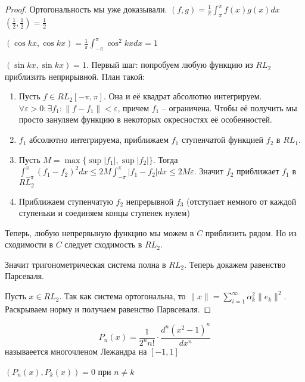 \documentclass[document.tex]{subfiles}
\begin{document}
\begin{proof}
    Ортогональность мы уже доказывали. $(f, g) = \frac{1}{\pi}\int_{\pi}^{\pi}f(x)g(x)dx$
    $(\frac{1}{2}, \frac{1}{2}) = \frac{1}{2}$

    $(\cos kx, \cos kx) = \frac{1}{\pi}\int_{-\pi}^{\pi}\cos^2 kx dx = 1$

    $(\sin kx, \sin kx) = 1$.
    Первый шаг: попробуем любую функцию из $RL_2$ приблизить неприрывной. План такой: 
    \begin{enumerate}
        \item Пусть $f \in RL_2[-\pi, \pi]$. Она и её квадрат абсолютно интегрируем. $\forall \varepsilon > 0: \exists
            f_1: \|f - f_1\| < \varepsilon$, причем $f_1$ -- ограничена. Чтобы её получить мы просто зануляем функцию в
            некоторых окресностях её особенностей.

        \item $f_1$ абсолютно интегрируема, приближаем $f_1$ ступенчатой функцией $f_2$ в $RL_1$. 
        \item Пусть $M = \max \{\sup |f_1|, \sup |f_2|\}$. Тогда $\int_{-\pi}^{\pi}(f_1 - f_2)^2dx \leq 2M
            \int_{-\pi}^{\pi}|f_1 - f_2|dx \leq 2M \varepsilon$. Значит $f_2$ приближает $f_1$ в $RL_2$
        \item Приближаем ступенчатую $f_2$ непрерывной $f_3$ (отступает немного от каждой ступеньки и соединяем концы ступенек
            нулем)
    \end{enumerate}

    Теперь, любую непрервыную функцию мы можем в $C$ приблизить рядом. Но из сходимости в $C$ следует сходимость в
    $RL_2$.

    Значит тригонометрическая система полна в $RL_2$. Теперь докажем равенство Парсеваля.

    Пусть $x \in RL_2$. Так как система ортогональна, то $\|x\| = \sum_{i = 1}^{\infty} \alpha_k^2 \|e_k\|^2$.
    Раскрываем норму и получаем равенство Парвсеваля.
\end{proof}

\begin{definition}
    \[
        P_n(x) = \frac{1}{2^{n}n!} \cdot \frac{d^n (x^2 - 1)^n}{dx^n}
    \] называеется многочленом Лежандра на $[-1, 1]$
\end{definition}

\begin{statement}
    $(P_n(x), P_k(x)) = 0$ при $n \neq k$
\end{statement}
\end{document}
